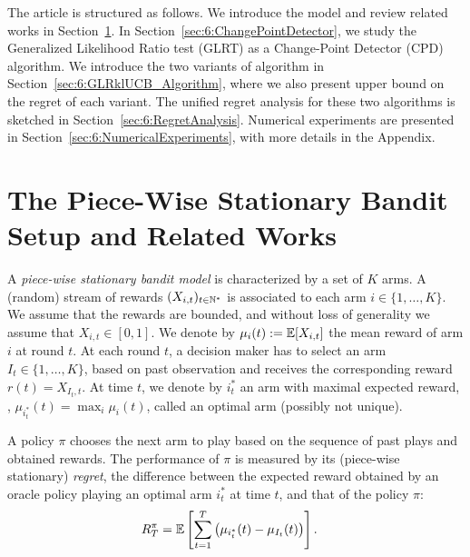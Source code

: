 The article is structured as follows. We introduce the model and review related works in Section~\ref{sec:6:BanditSetting}. In Section~\ref{sec:6:ChangePointDetector}, we study the Generalized Likelihood Ratio test (GLRT) as a Change-Point Detector (CPD) algorithm.
We introduce the two variants of \GLRklUCB{} algorithm in Section~\ref{sec:6:GLRklUCB_Algorithm}, where we also present upper bound on the regret of each variant. The unified regret analysis for these two algorithms is sketched in Section~\ref{sec:6:RegretAnalysis}. Numerical experiments
are presented in Section~\ref{sec:6:NumericalExperiments}, with more details in the Appendix.



\section{The Piece-Wise Stationary Bandit Setup and Related Works}
\label{sec:6:BanditSetting}

A \emph{piece-wise stationary bandit model} is characterized by a set of $K$ arms.  A (random) stream of rewards $(X_{i,t})_{t\in\mathbb{N}^*}$ is associated to each arm $i \in \{1,\dots,K\}$. We assume that the rewards are bounded, and without loss of generality we assume that $X_{i,t} \in [0,1]$. We denote by $\mu_{i}(t) :=  \mathbb{E}[X_{i,t}]$ the mean reward of arm $i$ at round $t$. At each round $t$, a decision maker has to select an arm $I_t\in\{1,\dots,K\}$, based on past observation and receives the corresponding reward $r(t) = X_{I_t,t}$. At time $t$, we denote by $i_t^*$ an arm with maximal expected reward, \ie, $\mu_{i_t^*}(t) = \max_i \mu_i(t)$, called an optimal arm (possibly not unique).

A policy $\pi$ chooses the next arm to play based on the sequence of past plays and obtained rewards.
The performance of $\pi$ is measured by its (piece-wise stationary) \emph{regret}, the difference between the expected reward obtained by an oracle policy playing an optimal arm $i^*_t$ at time $t$, and that of the policy $\pi$:
\begin{align}\label{def:6:nti}
    R_T^{\pi} &= \mathbb{E}\left[\sum_{t=1}^T \left(\mu_{i^*_t}(t) - \mu_{I_t}(t)\right)\right].
\end{align}


